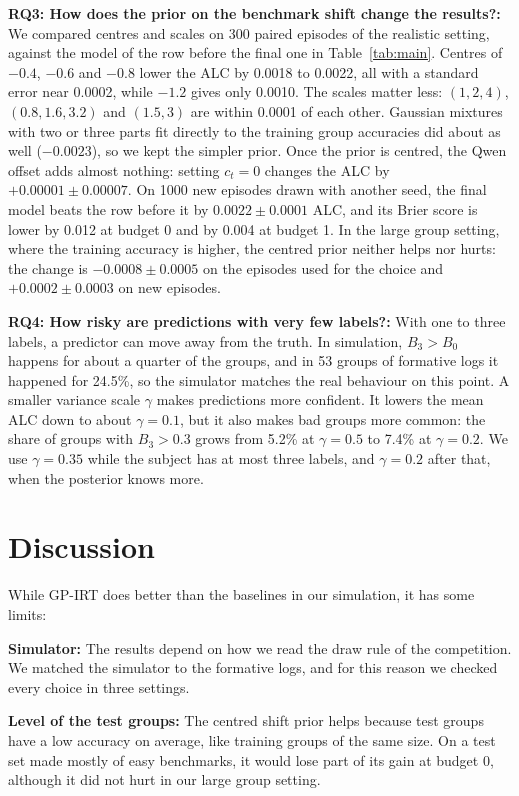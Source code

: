 \documentclass{article}
\begin{document}
\textbf{RQ3: How does the prior on the benchmark shift change the results?:} We compared centres and scales on 300
paired episodes of the realistic setting, against the model of the row before the final one in Table~\ref{tab:main}.
Centres of $-0.4$, $-0.6$ and $-0.8$ lower the ALC by 0.0018 to 0.0022, all with a standard error near 0.0002, while
$-1.2$ gives only 0.0010. The scales matter less: $(1, 2, 4)$, $(0.8, 1.6, 3.2)$ and $(1.5, 3)$ are within 0.0001 of
each other. Gaussian mixtures with two or three parts fit directly to the training group accuracies did about as well
($-0.0023$), so we kept the simpler prior. Once the prior is centred, the Qwen offset adds almost nothing: setting
$c_t=0$ changes the ALC by $+0.00001\pm0.00007$. On 1000 new episodes drawn with another seed, the final model beats
the row before it by $0.0022\pm0.0001$ ALC, and its Brier score is lower by 0.012 at budget 0 and by 0.004 at
budget 1. In the large group setting, where the training accuracy is higher, the centred prior neither helps nor
hurts: the change is $-0.0008\pm0.0005$ on the episodes used for the choice and $+0.0002\pm0.0003$ on new episodes.

\textbf{RQ4: How risky are predictions with very few labels?:}\label{sec:risk} With one to three labels, a predictor
can move away from the truth. In simulation, $B_3>B_0$ happens for about a quarter of the groups, and in 53 groups of
formative logs it happened for 24.5\%, so the simulator matches the real behaviour on this point. A smaller variance
scale $\gamma$ makes predictions more confident. It lowers the mean ALC down to about $\gamma=0.1$, but it also makes
bad groups more common: the share of groups with $B_3>0.3$ grows from 5.2\% at $\gamma=0.5$ to 7.4\% at
$\gamma=0.2$. We use $\gamma=0.35$ while the subject has at most three labels, and $\gamma=0.2$ after that, when the
posterior knows more.

\section{Discussion}\label{sec:negative}
While GP-IRT does better than the baselines in our simulation, it has some limits:

\textbf{Simulator:} The results depend on how we read the draw rule of the competition. We matched the simulator to
the formative logs, and for this reason we checked every choice in three settings.

\textbf{Level of the test groups:} The centred shift prior helps because test groups have a low accuracy on average,
like training groups of the same size. On a test set made mostly of easy benchmarks, it would lose part of its gain at
budget 0, although it did not hurt in our large group setting.
\end{document}
